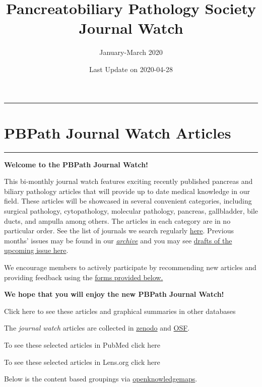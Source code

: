 \documentclass[
]{article}
\title{Pancreatobiliary Pathology Society Journal Watch}
\subtitle{January-March 2020}
\author{}
\date{\vspace{-2.5em}Last Update on 2020-04-28}
\begin{document}
\maketitle

{
\setcounter{tocdepth}{2}
\tableofcontents
}
\begin{center}\rule{0.5\linewidth}{0.5pt}\end{center}

\hypertarget{pbpath_jw}{%
\section{PBPath Journal Watch Articles}\label{pbpath_jw}}

\begin{center}\rule{0.5\linewidth}{0.5pt}\end{center}

\textbf{Welcome to the PBPath Journal Watch!}

This bi-monthly journal watch features exciting recently published
pancreas and biliary pathology articles that will provide up to date
medical knowledge in our field. These articles will be showcased in
several convenient categories, including surgical pathology,
cytopathology, molecular pathology, pancreas, gallbladder, bile ducts,
and ampulla among others. The articles in each category are in no
particular order. See the list of journals we search regularly
\href{http://pbpath.org/pbpath-journal-watch/}{here}. Previous months'
issues may be found in our
\emph{\href{http://pbpath.org/journal-watch-archive/}{archive}} and you
may see \href{http://pbpath.org/journal-watch-upcoming-issue/}{drafts of
the upcoming issue here}.

We encourage members to actively participate by recommending new
articles and providing feedback using the
\protect\hyperlink{feedback}{forms provided below.}

\textbf{We hope that you will enjoy the new PBPath Journal Watch!}

Click here to see these articles and graphical summaries in other
databases

The \emph{journal watch} articles are collected in
\href{https://doi.org/10.5281/zenodo.3635440}{zenodo} and
\href{https://osf.io/3d67y/}{OSF}.

To see these selected articles in PubMed click here

To see these selected articles in Lens.org click here

Below is the content based groupings via
\href{https://openknowledgemaps.org/map/69587f66f7536830fe8dafa88c1f521b?custom_title=Pancreatobiliary\%20Pathology\%20Society\%20Journal\%20Watch\%20January-March\%202020\&embed=true}{openknowledgemaps}.
\end{document}
